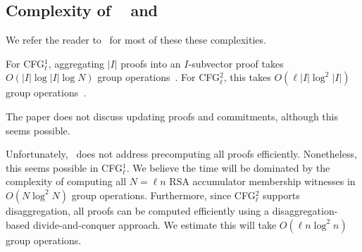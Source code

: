 \subsection{Complexity of \cfgOne~\cite{CFG+20} and \cfgTwo~\cite{CF13,LM18,LM19,CFG+20}}
We refer the reader to~\cite[Table 1, pg. 35]{CFG+20} for most of these these complexities.

For CFG$_{\ell}^1$, aggregating $|I|$ proofs into an $I$-subvector proof takes $O(|I|\log{|I|}\log{N})$ group operations~\cite[Sec 5.1, pg. 23]{CFG+20}.
For CFG$_{\ell}^2$, this takes $O(\ell |I|\log^2{|I|})$ group operations~\cite[Sec 5.2, pg. 32]{CFG+20}.

The paper does not discuss updating proofs and commitments, although this seems possible.

Unfortunately,~\cite{CFG+20} does not address precomputing all proofs efficiently.
Nonetheless, this seems possible in CFG$_\ell^{1}$.
We believe the time will be dominated by the complexity of computing all $N=\ell n$ RSA accumulator membership witnesses in $O(N\log^2{N})$ group operations.
Furthermore, since CFG$_\ell^{2}$ supports disaggregation, all proofs can be computed efficiently using a disaggregation-based divide-and-conquer approach.
We estimate this will take $O(\ell n\log^2{n})$ group operations.
